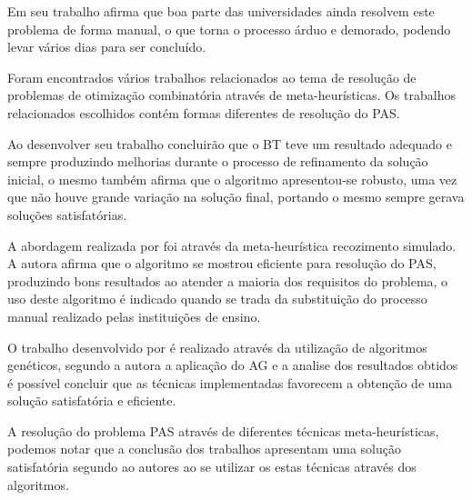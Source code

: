 Em seu trabalho \cite{souza2000} afirma que boa parte das universidades ainda resolvem este problema de forma manual, o que torna o processo árduo e demorado, podendo levar vários dias para ser concluído.\par




Foram encontrados vários trabalhos relacionados ao tema de resolução de problemas de otimização combinatória através de meta-heurísticas. Os trabalhos relacionados escolhidos contém formas diferentes de resolução do PAS.\par

Ao desenvolver seu trabalho \cite{subramanian2006aplicaccao} concluirão que o BT teve um resultado adequado e sempre produzindo melhorias durante o processo de refinamento da solução inicial, o mesmo também afirma que o algoritmo apresentou-se robusto, uma vez que não houve grande variação na solução final, portando o mesmo sempre gerava soluções satisfatórias.

A abordagem realizada por \cite{silva2005estudo} foi através da meta-heurística recozimento simulado. A autora afirma que o algoritmo se mostrou eficiente para resolução do PAS, produzindo bons resultados ao atender a maioria dos requisitos do problema, o uso deste algoritmo é indicado quando se trada da substituição do processo manual realizado pelas instituições de ensino.

O trabalho desenvolvido por \cite{hamawaki2011geraccao} é realizado através da utilização de algoritmos genéticos, segundo a autora a aplicação do AG e a analise dos resultados obtidos é possível concluir que as técnicas implementadas favorecem a obtenção de uma solução satisfatória e eficiente.

A resolução do problema PAS através de diferentes técnicas meta-heurísticas, podemos notar que a conclusão dos trabalhos apresentam uma solução satisfatória segundo ao autores ao se utilizar os estas técnicas através dos algoritmos.\par
